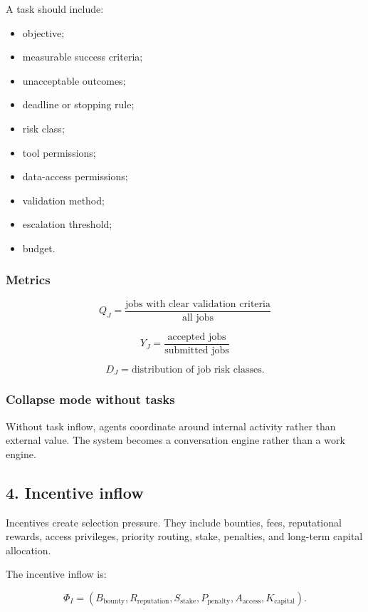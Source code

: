 A task should include:

\begin{itemize}
\tightlist
\item
  objective;
\item
  measurable success criteria;
\item
  unacceptable outcomes;
\item
  deadline or stopping rule;
\item
  risk class;
\item
  tool permissions;
\item
  data-access permissions;
\item
  validation method;
\item
  escalation threshold;
\item
  budget.
\end{itemize}

\subsubsection{Metrics}\label{metrics-2}

\[
Q_J=\frac{\text{jobs with clear validation criteria}}{\text{all jobs}}
\]

\[
Y_J=\frac{\text{accepted jobs}}{\text{submitted jobs}}
\]

\[
D_J=\text{distribution of job risk classes}.
\]

\subsubsection{Collapse mode without
tasks}\label{collapse-mode-without-tasks}

Without task inflow, agents coordinate around internal activity rather
than external value. The system becomes a conversation engine rather
than a work engine.

\subsection{4. Incentive inflow}\label{incentive-inflow}

Incentives create selection pressure. They include bounties, fees,
reputational rewards, access privileges, priority routing, stake,
penalties, and long-term capital allocation.

The incentive inflow is:

\[
\Phi_I=(B_{\text{bounty}},R_{\text{reputation}},S_{\text{stake}},P_{\text{penalty}},A_{\text{access}},K_{\text{capital}}).
\]

